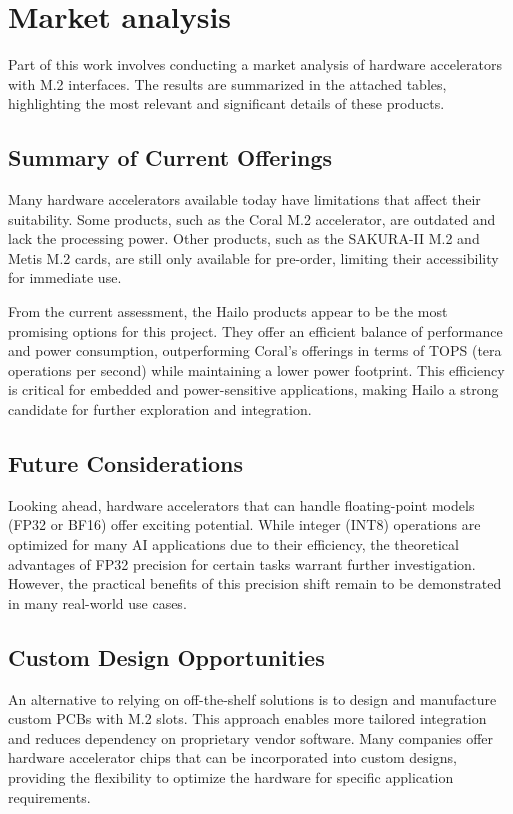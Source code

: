 \chapter{Market analysis
\label{chapter:marketanalysis}}

Part of this work involves conducting a market analysis of hardware accelerators with M.2 interfaces. 
The results are summarized in the attached tables, highlighting the most relevant and significant details of these products.

\section{Summary of Current Offerings}
Many hardware accelerators available today have limitations that affect their suitability.
Some products, such as the Coral M.2 accelerator, are outdated and lack the processing power.
Other products, such as the SAKURA-II M.2 and Metis M.2 cards, are still only available for pre-order, limiting their accessibility for immediate use.

From the current assessment, the Hailo products appear to be the most promising options for this project.
They offer an efficient balance of performance and power consumption, outperforming Coral's offerings in terms of TOPS (tera operations per second) while maintaining a lower power footprint.
This efficiency is critical for embedded and power-sensitive applications, making Hailo a strong candidate for further exploration and integration.

\section{Future Considerations}
Looking ahead, hardware accelerators that can handle floating-point models (FP32 or BF16) offer exciting potential.
While integer (INT8) operations are optimized for many AI applications due to their efficiency, the theoretical advantages of FP32 precision for certain tasks warrant further investigation.
However, the practical benefits of this precision shift remain to be demonstrated in many real-world use cases.


\section{Custom Design Opportunities}
An alternative to relying on off-the-shelf solutions is to design and manufacture custom PCBs with M.2 slots.
This approach enables more tailored integration and reduces dependency on proprietary vendor software.  
Many companies offer hardware accelerator chips that can be incorporated into custom designs, providing the flexibility to optimize the hardware for specific application requirements.


